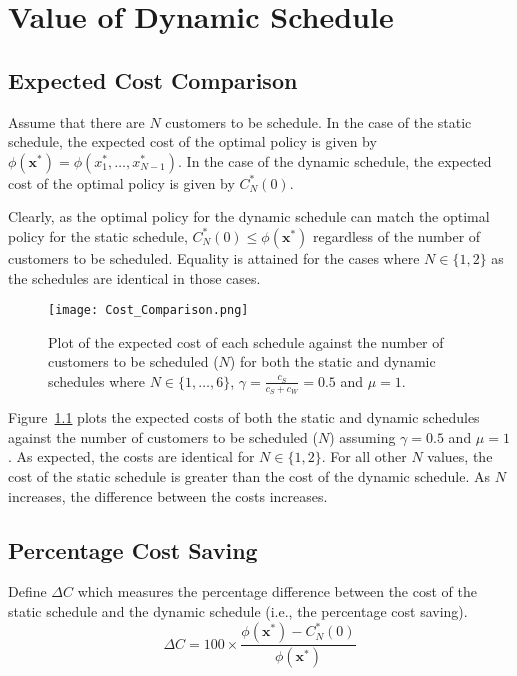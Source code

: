 \chapter{Value of Dynamic Schedule}

\section{Expected Cost Comparison}

Assume that there are $N$ customers to be schedule. In the case of the static schedule, the expected cost of the optimal policy is given by $\phi (\mathbf{x}^{*}) = \phi (x_{1}^{*}, \ldots, x_{N - 1}^{*})$. In the case of the dynamic schedule, the expected cost of the optimal policy is given by $C_{N}^{*} (0)$.

Clearly, as the optimal policy for the dynamic schedule can match the optimal policy for the static schedule, $C_{N}^{*} (0) \leq \phi (\mathbf{x}^{*})$ regardless of the number of customers to be scheduled. Equality is attained for the cases where $N \in \{ 1, 2 \}$ as the schedules are identical in those cases.

\begin{figure}[htb]
	\centering
	\texttt{[image: Cost\_Comparison.png]}
	\caption{Plot of the expected cost of each schedule against the number of customers to be scheduled ($N$) for both the static and dynamic schedules where $N \in \{ 1, \ldots, 6 \}$, $\gamma = \frac{c_{S}}{c_{S} + c_{W}} = 0.5$ and $\mu = 1$.}
	\label{Graph_Cost_Comparison}
\end{figure}

Figure~\ref{Graph_Cost_Comparison} plots the expected costs of both the static and dynamic schedules against the number of customers to be scheduled ($N$) assuming $\gamma = 0.5$ and $\mu = 1$. As expected, the costs are identical for $N \in \{ 1, 2 \}$. For all other $N$ values, the cost of the static schedule is greater than the cost of the dynamic schedule. As $N$ increases, the difference between the costs increases.

\section{Percentage Cost Saving}

Define $\Delta C$  which measures the percentage difference between the cost of the static schedule and the dynamic schedule (i.e., the percentage cost saving).
\begin{equation}
	\Delta C = 100 \times \frac{\phi (\mathbf{x}^{*}) - C_{N}^{*} (0)}{\phi (\mathbf{x}^{*})}
\end{equation}

